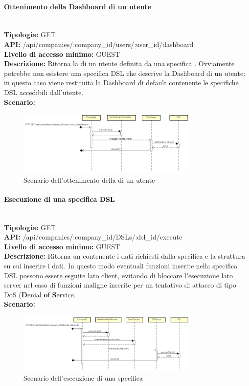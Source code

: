 \newpage
\paragraph{Ottenimento della Dashboard di un utente}\mbox{}\\
\textbf{Tipologia:} GET \\
\textbf{API:} /api/companies/:company\_id/users/:user\_id/dashboard \\
\textbf{Livello di accesso minimo:} GUEST \\
\textbf{Descrizione:} Ritorna la  di un utente definita da una specifica . Ovviamente potrebbe non esistere una specifica DSL che descrive la Dashboard di un utente: in questo caso viene restituita la Dashboard di default contenente le specifiche DSL accedibili dall'utente. \\
\textbf{Scenario:}  
\begin{figure}[H]
\centering
\includegraphics[width=0.8\textwidth]{res/sections/backend/sequence/(GET)dashboard.png}
\caption{Scenario dell'ottenimento della  di un utente}
\end{figure}

\newpage
\paragraph{Esecuzione di una specifica DSL}\mbox{}\\
\textbf{Tipologia:} GET \\
\textbf{API:} /api/companies/:company\_id/DSLs/:dsl\_id/execute \\
\textbf{Livello di accesso minimo:} GUEST \\
\textbf{Descrizione:} Ritorna un  contenente i dati richiesti dalla specifica  e la struttura su cui inserire i dati. In questo modo eventuali funzioni inserite nella specifica DSL possono essere esguite lato client, evitando di bloccare l'esecuzione lato server nel caso di funzioni maligne inserite per un tentativo di attacco di tipo DoS (\textbf{D}enial \textbf{o}f \textbf{S}ervice. \\
\textbf{Scenario:} 
\begin{figure}[H]
\centering
\includegraphics[width=0.8\textwidth]{res/sections/backend/sequence/(GET)dslByIDex.png}
\caption{Scenario dell'esecuzione di una specifica }
\end{figure}

